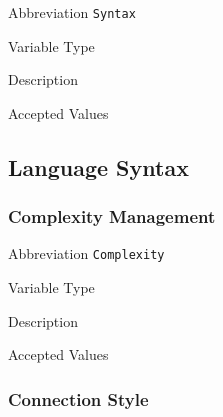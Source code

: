\begin{AlignedDesc}
  \item[Abbreviation] \texttt{Syntax}

  \item[Variable Type]

  \item[Description]

  \item[Accepted Values]

  \begin{AlignedDesc}
    \item[\textellipsis]
  \end{AlignedDesc}

\end{AlignedDesc}


\subsection{Language Syntax}
\label{sec:languagesyntax}

\subsubsection{Complexity Management}
\label{subsec:complexity}

\begin{AlignedDesc}
  \item[Abbreviation] \texttt{Complexity}

  \item[Variable Type]

  \item[Description]

  \item[Accepted Values]

  \begin{AlignedDesc}
    \item[\textellipsis]
  \end{AlignedDesc}

\end{AlignedDesc}

\subsubsection{Connection Style}
\label{subsec:connection}

